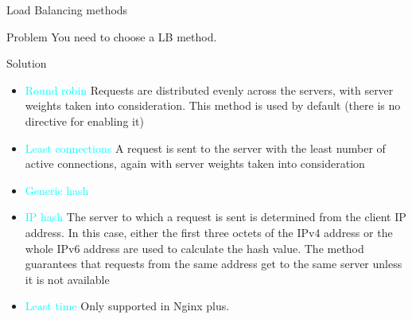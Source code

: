\documentclass{beamer}
\begin{document}
\begin{frame}{Load Balancing methods}

\scriptsize
\begin{block}{Problem}
	\vspace{0.02\textheight}
	You need to choose a LB method.
\end{block}

\begin{block}{Solution}
\begin{itemize}
	\item \textcolor{cyan}{Round robin} Requests are distributed evenly across the servers, with server weights taken into consideration. This method is used by default (there is no directive for enabling it)
	\item \textcolor{cyan}{Least connections} A request is sent to the server with the least number of active connections, again with server weights taken into consideration
	\item \textcolor{cyan}{Generic hash}
	\item \textcolor{cyan}{IP hash} The server to which a request is sent is determined from the client IP address. In this case, either the first three octets of the IPv4 address or the whole IPv6 address are used to calculate the hash value. The method guarantees that requests from the same address get to the same server unless it is not available
	\item \textcolor{cyan}{Least time} Only supported in Nginx plus.
\end{itemize}
\end{block}

\end{frame}
\end{document}
